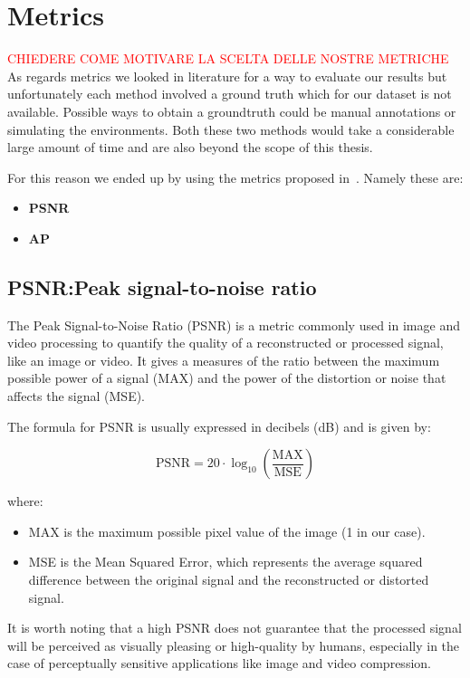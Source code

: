 \section{Metrics}\label{sec:Metrics}
\textcolor{red}{CHIEDERE COME MOTIVARE LA SCELTA DELLE NOSTRE METRICHE}
As regards metrics we looked in literature for a way to evaluate
our results but unfortunately each method involved a ground truth
which for our dataset is not available. Possible ways to obtain
a groundtruth could be manual annotations or simulating the environments.
Both these two methods would take a considerable large amount
of time and are also beyond the scope of this thesis.

For this reason we ended up by using the metrics proposed in~\cite{neuraldiff}.
Namely these are:
\begin{itemize}
    \item \textbf{PSNR}
    \item \textbf{AP}
\end{itemize}
\subsection{PSNR:Peak signal-to-noise ratio}
The Peak Signal-to-Noise Ratio (PSNR) is a metric commonly used in image and
video processing to quantify the quality of a reconstructed or processed signal,
like an image or video. It gives a measures of the ratio between the 
maximum possible power of a signal (MAX) and the power of the distortion or noise 
that affects the signal (MSE).

The formula for PSNR is usually expressed in decibels (dB) and is given by:

\[ \text{PSNR} = 20 \cdot \log_{10}\left(\frac{{\text{MAX}}}{{\text{MSE}}}\right) \]

where:
\begin{itemize}
    \item MAX is the maximum possible pixel value of the image (1 in our case).
    \item MSE is the Mean Squared Error, which represents the average squared 
    difference between the original signal and the reconstructed or distorted signal.
\end{itemize}

It is worth noting that a high PSNR does not guarantee that the processed signal 
will be perceived as visually pleasing or high-quality by humans, especially in the case of perceptually sensitive applications like image and video compression.

